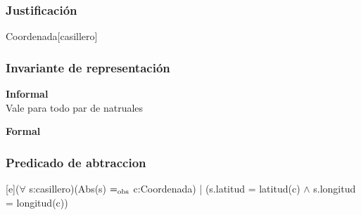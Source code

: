 \begin{Representacion}
\subsubsection{Justificación}
	\begin{Estructura}{Coordenada}[casillero]
		\begin{Tupla}[casillero]
		\end{Tupla}
	\end{Estructura}
	
\subsubsection{Invariante de representación}

\textbf{Informal}\\

Vale para todo par de natruales

\textbf{Formal}\\


\subsubsection{Predicado de abtraccion}

[e]{($\forall$ s:casillero)(Abs(s) $=_{\mathrm{obs}}$ c:Coordenada) | (s.latitud = latitud(c) $\wedge$ s.longitud = longitud(c))}

\end{Representacion}


